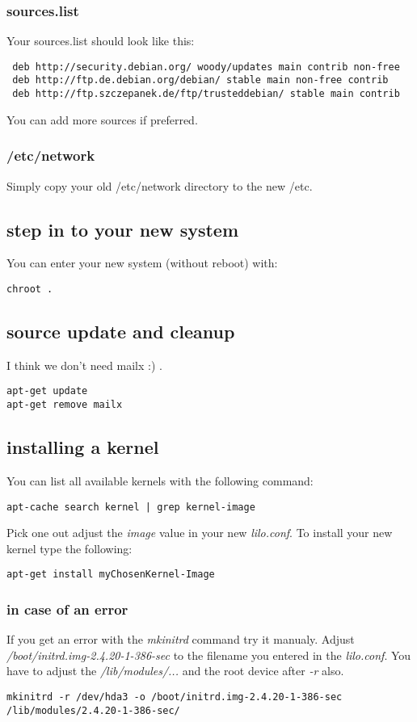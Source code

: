 \subsubsection{sources.list}
Your sources.list should look like this:
\begin{verbatim}
 deb http://security.debian.org/ woody/updates main contrib non-free
 deb http://ftp.de.debian.org/debian/ stable main non-free contrib
 deb http://ftp.szczepanek.de/ftp/trusteddebian/ stable main contrib
\end{verbatim}
You can add more sources if preferred.

\subsubsection{/etc/network}
Simply copy your old /etc/network directory to the new /etc.

\subsection{step in to your new system}
You can enter your new system (without reboot) with:
\begin{verbatim}
chroot .
\end{verbatim}

\subsection{source update and cleanup}
I think we don't need mailx :) .
\begin{verbatim}
apt-get update
apt-get remove mailx
\end{verbatim}

\subsection{installing a kernel}
You can list all available kernels with the following command:
\begin{verbatim}
apt-cache search kernel | grep kernel-image
\end{verbatim}
Pick one out adjust the \textit{image} value in your new \textit{lilo.conf}. To install your new kernel type the following:
\begin{verbatim}
apt-get install myChosenKernel-Image
\end{verbatim}

\subsubsection{in case of an error}
If you get an error with the \textit{mkinitrd} command try it manualy. Adjust \textit{/boot/initrd.img-2.4.20-1-386-sec} to the filename you entered in the \textit{lilo.conf}. You have to adjust the \textit{/lib/modules/...} and the root device after \textit{-r} also.
\begin{verbatim}
mkinitrd -r /dev/hda3 -o /boot/initrd.img-2.4.20-1-386-sec /lib/modules/2.4.20-1-386-sec/
\end{verbatim}

